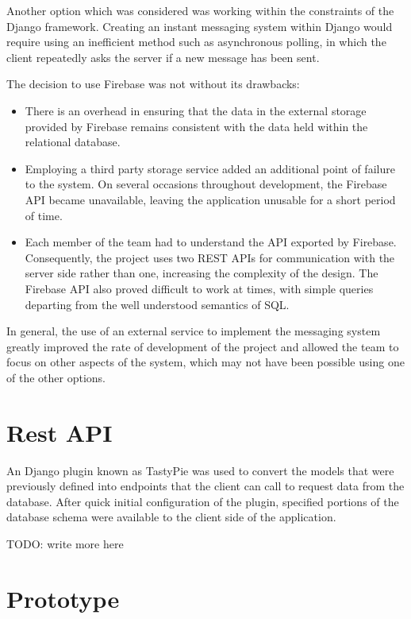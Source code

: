 \documentclass[a4paper]{l3proj}
\begin{document}
Another option which was considered was working within the constraints of the Django framework. Creating an instant messaging system within Django would require using an inefficient method such as asynchronous polling, in which the client repeatedly asks the server if a new message has been sent.

The decision to use Firebase was not without its drawbacks:
\begin{itemize}
\item There is an overhead in ensuring that the data in the external storage provided by Firebase remains consistent with the data held within the relational database.
\item Employing a third party storage service added an additional point of failure to the system. On several occasions throughout development, the Firebase API became unavailable, leaving the application unusable for a short period of time.
\item Each member of the team had to understand the API exported by Firebase. Consequently, the project uses two REST APIs for communication with the server side rather than one, increasing the complexity of the design. The Firebase API also proved difficult to work at times, with simple queries departing from the well understood semantics of SQL.
\end{itemize}

In general, the use of an external service to implement the messaging system greatly improved the rate of development of the project and allowed the team to focus on other aspects of the system, which may not have been possible using one of the other options.

\section{Rest API}
\label{restApi}

An Django plugin known as TastyPie was used to convert the models that were previously defined into endpoints that the client can call to request data from the database. After quick initial configuration of the plugin, specified portions of the database schema were available to the client side of the application. 

TODO: write more here
\section{Prototype}
\label{prototype}
\end{document}

